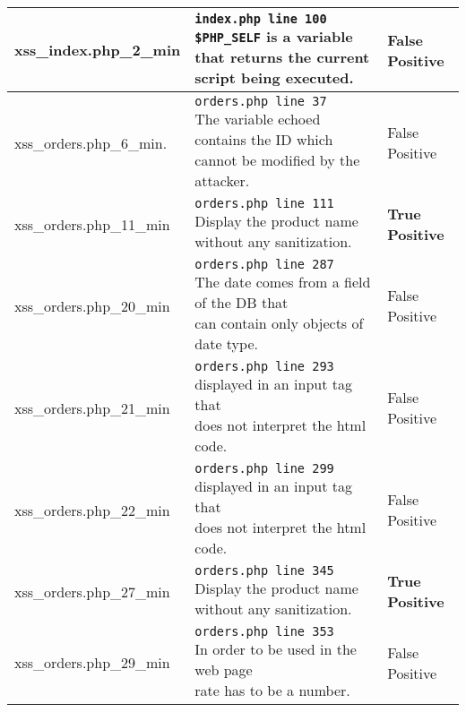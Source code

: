 \documentclass[11pt]{article}
\begin{document}
\begin{longtable}[H]{| p{} | p{} | p{} |}
	 	\hline
	  	xss\_index.php\_2\_min
	  	& \makecell{ \texttt{index.php line 100} \\
				 \texttt{\$PHP\_SELF} is a variable that returns \\
				 the current script being executed.}  
	 	& False Positive \\


	 	\hline
	  	xss\_orders.php\_6\_min. 	
	  	& \makecell{ \texttt{orders.php line 37} \\
				 The variable echoed contains the ID which \\
				 cannot be modified by the attacker.}  
	 	& False Positive \\

	 	\hline
	  	xss\_orders.php\_11\_min 	
	  	& \makecell{ \texttt{orders.php line 111} \\
				 Display the product name without any sanitization.}  
	 	& \textbf{True Positive}\\

	 	\hline
	  	xss\_orders.php\_20\_min 	
	  	& \makecell{ \texttt{orders.php line 287} \\
				 The date comes from a field of the DB that \\
				 can contain only objects of date type.}  
	 	& False Positive \\

	 	\hline
	  	xss\_orders.php\_21\_min 	
	  	& \makecell{ \texttt{orders.php line 293} \\
				 displayed in an input tag that \\
				 does not interpret the html code.}  
	 	& False Positive \\

	 	\hline
	  	xss\_orders.php\_22\_min 	
	  	& \makecell{ \texttt{orders.php line 299} \\
				 displayed in an input tag that \\
				 does not interpret the html code.}  
	 	& False Positive \\

	 	\hline
	  	xss\_orders.php\_27\_min 	
	  	& \makecell{ \texttt{orders.php line 345} \\
				 Display the product name without any sanitization.}  
	 	& \textbf{True Positive}\\

	 	\hline
	  	xss\_orders.php\_29\_min 	
	  	& \makecell{ \texttt{orders.php line 353} \\
				 In order to be used in the web page\\
				 rate has to be a number.}  
	 	& False Positive \\


\end{longtable}
\end{document}
